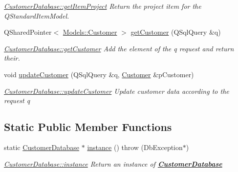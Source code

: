 \begin{DoxyCompactItemize}
\begin{DoxyCompactList}\small\item\em \hyperlink{classDatabases_1_1CustomerDatabase_a641001509d0385000b5b831c134c78c4}{Customer\+Database\+::get\+Item\+Project} Return the project item for the Q\+Standard\+Item\+Model. \end{DoxyCompactList}\item 
Q\+Shared\+Pointer$<$ \hyperlink{classModels_1_1Customer}{Models\+::\+Customer} $>$ \hyperlink{classDatabases_1_1CustomerDatabase_a23017b6db7808fa1d03e55e063418670}{get\+Customer} (Q\+Sql\+Query \&q)
\begin{DoxyCompactList}\small\item\em \hyperlink{classDatabases_1_1CustomerDatabase_ab0544439382fb6891cd7d27f67cb120c}{Customer\+Database\+::get\+Customer} Add the element of the {\itshape q} request and return their. \end{DoxyCompactList}\item 
void \hyperlink{classDatabases_1_1CustomerDatabase_aedb0c575bd9141547e4e084fd260beb7}{update\+Customer} (Q\+Sql\+Query \&q, \hyperlink{classModels_1_1Customer}{Customer} \&p\+Customer)
\begin{DoxyCompactList}\small\item\em \hyperlink{classDatabases_1_1CustomerDatabase_a83493698214a2e8e68024d007e715f35}{Customer\+Database\+::update\+Customer} Update customer data according to the request {\itshape q} \end{DoxyCompactList}\end{DoxyCompactItemize}
\subsection*{Static Public Member Functions}
\begin{DoxyCompactItemize}
\item 
static \hyperlink{classDatabases_1_1CustomerDatabase}{Customer\+Database} $\ast$ \hyperlink{classDatabases_1_1CustomerDatabase_a564b9978741e84e75d7e20003f7bf515}{instance} ()  throw (\+Db\+Exception$\ast$)
\begin{DoxyCompactList}\small\item\em \hyperlink{classDatabases_1_1CustomerDatabase_a564b9978741e84e75d7e20003f7bf515}{Customer\+Database\+::instance} Return an instance of {\bfseries \hyperlink{classDatabases_1_1CustomerDatabase}{Customer\+Database}} \end{DoxyCompactList}\end{DoxyCompactItemize}
